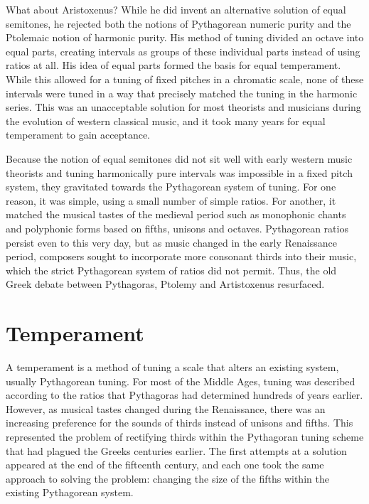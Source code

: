 What about Aristoxenus?  While he did invent an alternative solution of equal semitones,
he rejected both the notions of Pythagorean numeric purity and the Ptolemaic notion of
harmonic purity.  His method of tuning divided an octave into equal parts, creating
intervals as groups of these individual parts instead of using ratios at all.  His idea of
equal parts formed the basis for equal temperament.  While this allowed for a tuning of
fixed pitches in a chromatic scale, none of these intervals were tuned in a way that
precisely matched the tuning in the harmonic series.  This was an unacceptable solution
for most theorists and musicians during the evolution of western classical music, and it
took many years for equal temperament to gain acceptance.

Because the notion of equal semitones did not sit well with early western music theorists
and tuning harmonically pure intervals was impossible in a fixed pitch system, they
gravitated towards the Pythagorean system of tuning.  For one reason, it was simple,
using a small number of simple ratios.  For another, it matched
the musical tastes of the medieval period such as monophonic chants and polyphonic forms
based on fifths, unisons and octaves.  Pythagorean ratios persist even to this very day,
but as music changed in the early Renaissance period, composers sought to incorporate more
consonant thirds into their music, which the strict Pythagorean system of ratios did not
permit.  Thus, the old Greek debate between Pythagoras, Ptolemy and
Artistoxenus resurfaced.

\section{Temperament}

A temperament is a method of tuning a scale that alters an existing system, usually
Pythagorean tuning. For most of the Middle Ages, tuning was described according to the
ratios that Pythagoras had determined hundreds of years earlier. However, as musical
tastes changed during the Renaissance, there was an increasing preference for the sounds
of thirds instead of unisons and fifths. This represented the problem of rectifying thirds
within the Pythagoran tuning scheme that had plagued the Greeks centuries earlier. The
first attempts at a solution appeared at the end of the fifteenth century, and each one
took the same approach to solving the problem: changing the size of
the fifths within the existing Pythagorean system.

